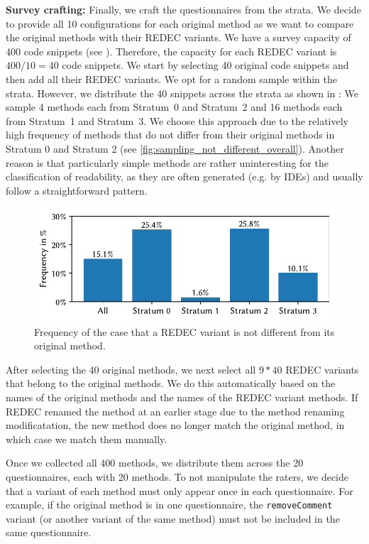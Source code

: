 \documentclass[%
class=scrreprt,
chapterprefix=false,%
open=right,%
twoside=false,%
paper=a4,%
logofile={Logo\_zentral\_farbig\_EN.png},%
thesistype=master,%
UKenglish,%
]{se2thesis}
\theoremstyle{definition}
\newcommand{\mod}{modificatation\xspace}
\newcommand{\rdh}{REDEC\xspace}
\begin{document}
	\textbf{Survey crafting:} Finally, we craft the questionnaires from the strata. We decide to provide all 10 configurations for each original method as we want to compare the original methods with their \rdh variants. We have a survey capacity of 400 code snippets (see ). Therefore, the capacity for each \rdh variant is $400/10 = 40$ code snippets. We start by selecting 40 original code snippets and then add all their \rdh variants.
	We opt for a random sample within the strata. However, we distribute the 40 snippets across the strata as shown in :
	We sample 4 methods each from Stratum~0 and Stratum~2 and 16 methods each from Stratum~1 and Stratum~3.
	We choose this approach due to the relatively high frequency of methods that do not differ from their original methods in Stratum 0 and Stratum 2 (see \autoref{fig:sampling_not_different_overall}). Another reason is that particularly simple methods are rather uninteresting for the classification of readability, as they are often generated (e.g. by IDEs) and usually follow a straightforward pattern.
	
	\begin{figure}[tb]
		\centering
		\includegraphics[width=\textwidth]{img/sampling_not_different_overall_ylim.pdf}
		\caption{Frequency of the case that a \rdh variant is not different from its original method.} 
		\label{fig:sampling_not_different_overall}
	\end{figure}
		
	After selecting the 40 original methods, we next select all $9*40$ \rdh variants that belong to the original methods. We do this automatically based on the names of the original methods and the names of the \rdh variant methods. If \rdh renamed the method at an earlier stage due to the method renaming \mod, the new method does no longer match the original method, in which case we match them manually.
		
	Once we collected all 400 methods, we distribute them across the 20 questionnaires, each with 20 methods. To not manipulate the raters, we decide that a variant of each method must only appear once in each questionnaire. For example, if the original method is in one questionnaire, the \texttt{removeComment} variant (or another variant of the same method) must not be included in the same questionnaire.
		
\end{document}

